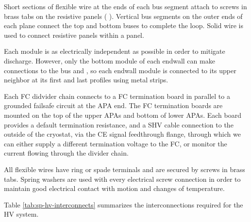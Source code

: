 Short sections of flexible wire at the ends of each  bus segment
attach to screws in brass tabs on the  resistive panels ( ).
Vertical  bus segments on the outer ends of each  plane connect
the top and bottom  buses to complete the loop.  Solid wire is used
to connect resistive panels within a  panel.

Each  module is as electrically independent as possible in order to
mitigate discharge.  However, only the bottom module of each endwall
can make connections to the  bus and , so each endwall module
is connected to its upper neighbor at its first and last profiles
using metal strips.

Each FC didvider chain connects to a FC termination board in parallel to a grounded failsafe circuit at the APA end.  The FC termination boards are mounted on the top of the upper APAs and bottom of lower APAs.  Each board provides a default termination resistance, and a SHV cable connection to the outside of the cryostat, via the CE signal feedthrough flange, through which we can either supply a different termination voltage to the FC, or monitor the current flowing through the divider chain.

All flexible wires have ring or spade terminals and are secured by
screws in brass tabs.  Spring washers are used with every electrical
screw connection in order to maintain good electrical contact with
motion and changes of temperature.

Table \ref{tab:sp-hv-interconnects} summarizes the interconnections required 
for the HV system.

